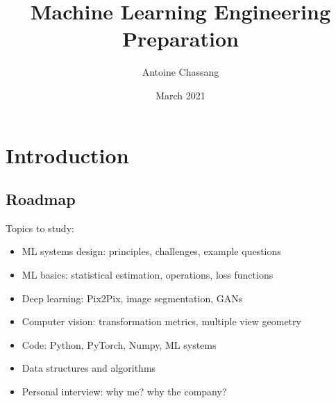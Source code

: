 \documentclass{report}
\title{Machine Learning Engineering Preparation}
\author{Antoine Chassang}
\date{March 2021}
\begin{document}
\maketitle
\tableofcontents

\chapter{Introduction}
\section{Roadmap}
Topics to study:
\begin{itemize}
    \item ML systems design: principles, challenges, example questions
    \item ML basics: statistical estimation, operations, loss functions
    \item Deep learning: Pix2Pix, image segmentation, GANs
    \item Computer vision: transformation metrics, multiple view geometry
    \item Code: Python, PyTorch, Numpy, ML systems
    \item Data structures and algorithms
    \item Personal interview: why me? why the company?
\end{itemize}










\end{document}
